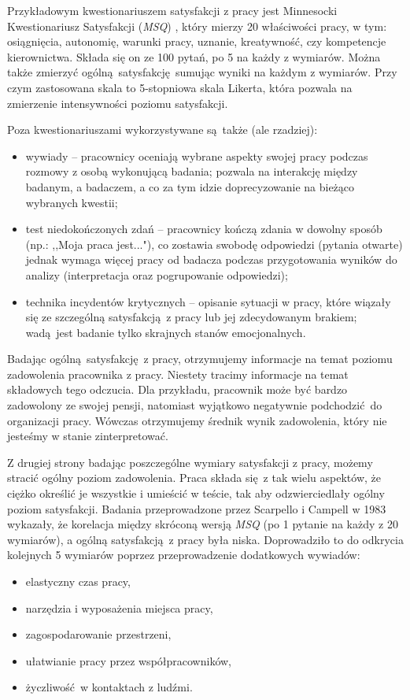 Przykładowym kwestionariuszem satysfakcji z pracy jest Minnesocki Kwestionariusz Satysfakcji (\emph{MSQ}) \cite{weiss1967manual}, który mierzy 20 właściwości pracy, w tym: osiągnięcia, autonomię, warunki pracy, uznanie, kreatywność, czy kompetencje kierownictwa. Składa się on ze 100 pytań, po 5 na każdy z wymiarów. Można także zmierzyć
ogólną satysfakcję sumując wyniki na każdym z wymiarów. Przy czym zastosowana skala to 5-stopniowa skala Likerta, która pozwala na zmierzenie intensywności poziomu satysfakcji.

Poza kwestionariuszami wykorzystywane są także (ale rzadziej):
\begin{itemize}
\item wywiady -- pracownicy oceniają wybrane aspekty swojej pracy podczas rozmowy z osobą wykonującą badania; pozwala na interakcję między badanym, a badaczem, a co za tym idzie doprecyzowanie na bieżąco wybranych kwestii;
\item test niedokończonych zdań -- pracownicy kończą zdania w dowolny sposób (np.: ,,Moja praca jest..."), co zostawia swobodę odpowiedzi (pytania otwarte) jednak wymaga więcej pracy od badacza podczas przygotowania wyników do analizy (interpretacja oraz pogrupowanie odpowiedzi);
\item technika incydentów krytycznych -- opisanie sytuacji w pracy, które wiązały się ze szczególną satysfakcją z pracy lub jej zdecydowanym brakiem; wadą jest badanie tylko skrajnych stanów emocjonalnych.
\end{itemize}

Badając ogólną satysfakcję z pracy, otrzymujemy informacje na temat poziomu zadowolenia pracownika z pracy. Niestety tracimy informacje na temat składowych tego odczucia. Dla przykładu, pracownik może być bardzo zadowolony ze swojej pensji, natomiast wyjątkowo negatywnie podchodzić do organizacji pracy. Wówczas otrzymujemy średnik wynik zadowolenia, który nie jesteśmy w stanie zinterpretować.

Z drugiej strony badając poszczególne wymiary satysfakcji z pracy, możemy stracić ogólny poziom zadowolenia. Praca składa się z tak wielu aspektów, że ciężko określić je wszystkie i umieścić w teście, tak aby odzwierciedlały ogólny poziom satysfakcji. Badania przeprowadzone przez Scarpello i Campell w 1983 \cite{scarpello1983job} wykazały, że korelacja między skróconą wersją \emph{MSQ} (po 1 pytanie na każdy z 20 wymiarów), a ogólną satysfakcją z pracy była niska. Doprowadziło to do odkrycia
kolejnych 
5 wymiarów poprzez przeprowadzenie dodatkowych wywiadów:
\begin{itemize}
\item elastyczny czas pracy,
\item narzędzia i wyposażenia miejsca pracy,
\item zagospodarowanie przestrzeni,
\item ułatwianie pracy przez współpracowników,
\item życzliwość w kontaktach z ludźmi.
\end{itemize}
